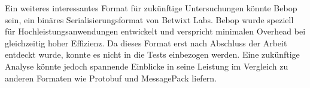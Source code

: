 \documentclass[ngerman]{seminarvorlage}
\begin{document}
Ein weiteres interessantes Format für zukünftige Untersuchungen könnte Bebop sein, ein binäres Serialisierungsformat von Betwixt Labs. Bebop wurde speziell für Hochleistungsanwendungen entwickelt und verspricht minimalen Overhead bei gleichzeitig hoher Effizienz. Da dieses Format erst nach Abschluss der Arbeit entdeckt wurde, konnte es nicht in die Tests einbezogen werden. Eine zukünftige Analyse könnte jedoch spannende Einblicke in seine Leistung im Vergleich zu anderen Formaten wie Protobuf und MessagePack liefern. \cite{bebop_serialization}

%
%


\newpage 

\end{document}
